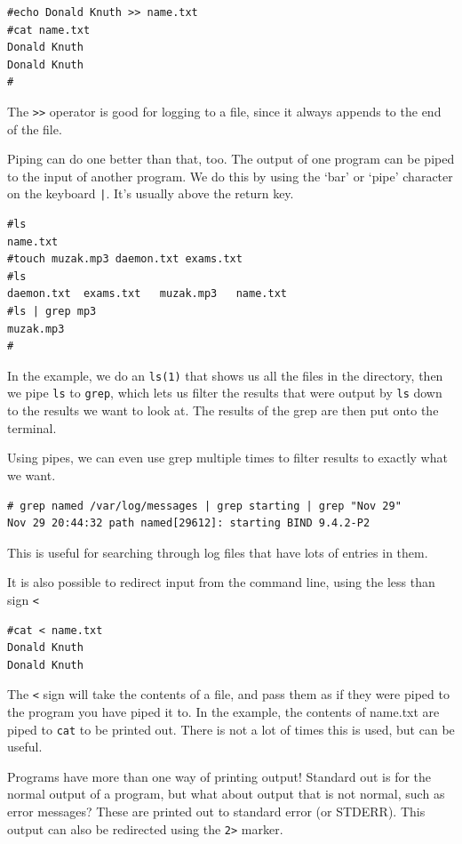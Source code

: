 \begin{verbatim}
#echo Donald Knuth >> name.txt
#cat name.txt
Donald Knuth
Donald Knuth
#
\end{verbatim}

The {\tt >>} operator is good for logging to a file, since it always appends
to the end of the file.

Piping can do one better than that, too. The output of one program can 
be piped to the input of another program. We do this by using the `bar' or 
`pipe' character on the keyboard {\tt |}. It's usually above the return key.

\begin{verbatim}
#ls
name.txt
#touch muzak.mp3 daemon.txt exams.txt
#ls
daemon.txt	exams.txt	muzak.mp3	name.txt
#ls | grep mp3
muzak.mp3
#
\end{verbatim}

In the example, we do an {\tt ls(1)} that shows us all the files in the directory,
then we pipe {\tt ls} to {\tt grep}, which lets us filter the results that were 
output by {\tt ls} down to the results we want to look at. The results of the 
grep are then put onto the terminal. 

Using pipes, we can even use grep multiple times to filter results to 
exactly what we want.

\begin{verbatim}
# grep named /var/log/messages | grep starting | grep "Nov 29" 
Nov 29 20:44:32 path named[29612]: starting BIND 9.4.2-P2
\end{verbatim}

This is useful for searching through log files that
have lots of entries in them.

It is also possible to redirect input from the command line, using the
less than sign {\tt < }

\begin{verbatim}
#cat < name.txt 
Donald Knuth
Donald Knuth
\end{verbatim}

The {\tt <} sign will take the contents of a file, and 
pass them as if they were piped to the program you 
have piped it to. In the example, the contents of name.txt
are piped to {\tt cat} to be printed out. There is not 
a lot of times this is used, but can be useful.


Programs have more than one way of printing output!
Standard out is for the normal output of a program, but what about 
output that is not normal, such as error messages? These are printed 
out to standard error (or STDERR). This output can also be redirected
using the {\tt 2>} marker.

